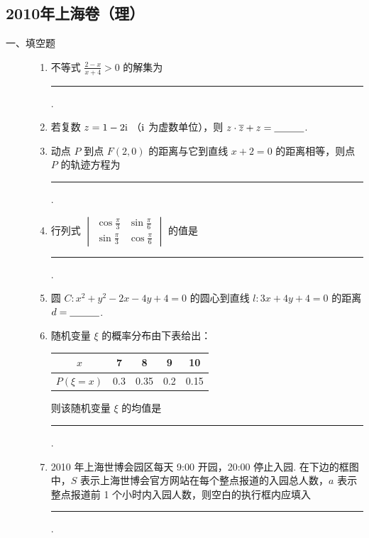\subsection{2010年上海卷（理）}\label{gk:2010年上海卷（理）}

\begin{description}

    \item[一、填空题]

    \begin{enumerate}[leftmargin=5pt]

        \item 不等式 \(\frac{2 - x}{x + 4} > 0\) 的解集为\rule[-0.3ex]{3em}{0.4pt}.

        \item 若复数 \(z = 1 - 2\mathrm{i}\) （\(\mathrm{i}\) 为虚数单位），则 \(z \cdot \overline{z} + z =\rule[-0.3ex]{3em}{0.4pt}\).

        \item 动点 \(P\) 到点 \(F(2,0)\) 的距离与它到直线 \(x + 2 = 0\) 的距离相等，则点 \(P\) 的轨迹方程为\rule[-0.3ex]{3em}{0.4pt}.

        \item 行列式 \(\begin{vmatrix} \cos \frac{\pi}{3} & \sin \frac{\pi}{6} \\ \sin \frac{\pi}{3} & \cos \frac{\pi}{6} \end{vmatrix}\) 的值是\rule[-0.3ex]{3em}{0.4pt}.

        \item 圆 \(C: x^{2} + y^{2} - 2x - 4y + 4 = 0\) 的圆心到直线 \(l: 3x + 4y + 4 = 0\) 的距离 \(d =\rule[-0.3ex]{3em}{0.4pt}\).

        \item 随机变量 \(\xi\) 的概率分布由下表给出：

\begin{center}
\begin{tabular}{c|cccc}
\(x\) & 7 & 8 & 9 & 10 \\
\hline
\(P(\xi = x)\) & 0.3 & 0.35 & 0.2 & 0.15
\end{tabular}
\end{center}

则该随机变量 \(\xi\) 的均值是\rule[-0.3ex]{3em}{0.4pt}.

        \item 2010 年上海世博会园区每天 9:00 开园，20:00 停止入园. 在下边的框图中，\(S\) 表示上海世博会官方网站在每个整点报道的入园总人数，\(a\) 表示整点报道前 1 个小时内入园人数，则空白的执行框内应填入\rule[-0.3ex]{3em}{0.4pt}.


\end{enumerate}
\end{description}
